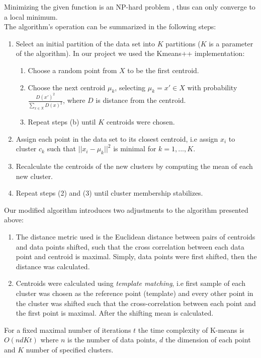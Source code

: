 Minimizing the given function is an \textsc{NP}-hard problem \cite{Drineas_1999}, thus can only converge to a local minimum.\\
The algorithm's operation can be summarized in the following steps:
\begin{enumerate}
\item Select an initial partition of the data set into $K$ partitions ($K$ is a parameter of the algorithm). In our project we used the Kmeans++ implementation\cite{10.5555/1283383.1283494}:
	\begin{enumerate}
	\item Choose a random point from $X$ to be the first centroid.
	\item Choose the next centroid $\mu_k$, selecting $\mu_k=x' \in X$ with probability $\frac{D(x')^2}{\sum_{x \in X}{D(x)^2}}$, where $D$ is distance from the centroid.
	\item Repeat steps (b) until $K$ centroids were chosen.
	\end{enumerate}
\item Assign each point in the data set to its closest centroid, i.e assign $x_i$ to cluster $c_k$ such that $||x_i-\mu_k||^2$ is minimal for $k=1,...,K$.
\item Recalculate the centroids of the new clusters by computing the mean of each new cluster.
\item Repeat steps (2) and (3) until cluster membership stabilizes.
\end{enumerate}
Our modified algorithm introduces two adjustments to the algorithm presented above:
\begin{enumerate}
\item The distance metric used is the Euclidean distance between pairs of centroids and data points shifted, such that the cross correlation between each data point and centroid is maximal. Simply, data points were first shifted, then the distance was calculated.
\item Centroids were calculated using \textit{template matching}, i.e first sample of each cluster was chosen as the reference point (template) and every other point in the cluster was shifted such that the cross-correlation between each point and the first point is maximal. After the shifting mean is calculated.
\end{enumerate}
For a fixed maximal number of iterations $t$ the time complexity of K-means is $O(ndKt)$ where $n$ is the number of data points, $d$ the dimension of each point and $K$ number of specified clusters.